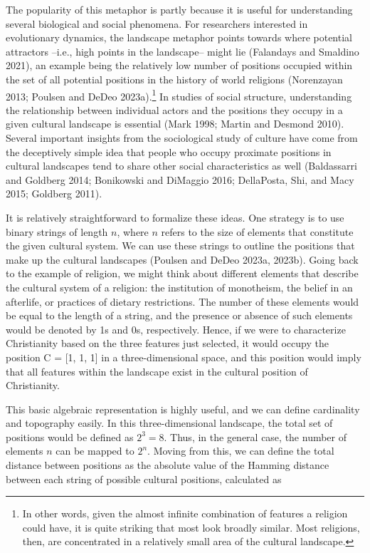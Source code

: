 \documentclass[
  11pt,
]{article}
\begin{document}
The popularity of this metaphor is partly because it is useful for
understanding several biological and social phenomena. For researchers
interested in evolutionary dynamics, the landscape metaphor points
towards where potential attractors --i.e., high points in the
landscape-- might lie (Falandays and Smaldino 2021), an example being
the relatively low number of positions occupied within the set of all
potential positions in the history of world religions (Norenzayan 2013;
Poulsen and DeDeo 2023a).\footnote{In other words, given the almost
  infinite combination of features a religion could have, it is quite
  striking that most look broadly similar. Most religions, then, are
  concentrated in a relatively small area of the cultural landscape.} In
studies of social structure, understanding the relationship between
individual actors and the positions they occupy in a given cultural
landscape is essential (Mark 1998; Martin and Desmond 2010). Several
important insights from the sociological study of culture have come from
the deceptively simple idea that people who occupy proximate positions
in cultural landscapes tend to share other social characteristics as
well (Baldassarri and Goldberg 2014; Bonikowski and DiMaggio 2016;
DellaPosta, Shi, and Macy 2015; Goldberg 2011).

It is relatively straightforward to formalize these ideas. One strategy
is to use binary strings of length \(n\), where \(n\) refers to the size
of elements that constitute the given cultural system. We can use these
strings to outline the positions that make up the cultural landscapes
(Poulsen and DeDeo 2023a, 2023b). Going back to the example of religion,
we might think about different elements that describe the cultural
system of a religion: the institution of monotheism, the belief in an
afterlife, or practices of dietary restrictions. The number of these
elements would be equal to the length of a string, and the presence or
absence of such elements would be denoted by 1s and 0s, respectively.
Hence, if we were to characterize Christianity based on the three
features just selected, it would occupy the position C = {[}1, 1, 1{]}
in a three-dimensional space, and this position would imply that all
features within the landscape exist in the cultural position of
Christianity.

This basic algebraic representation is highly useful, and we can define
cardinality and topography easily. In this three-dimensional landscape,
the total set of positions would be defined as \(2^3 = 8\). Thus, in the
general case, the number of elements \(n\) can be mapped to \(2^n\).
Moving from this, we can define the total distance between positions as
the absolute value of the Hamming distance between each string of
possible cultural positions, calculated as
\end{document}

